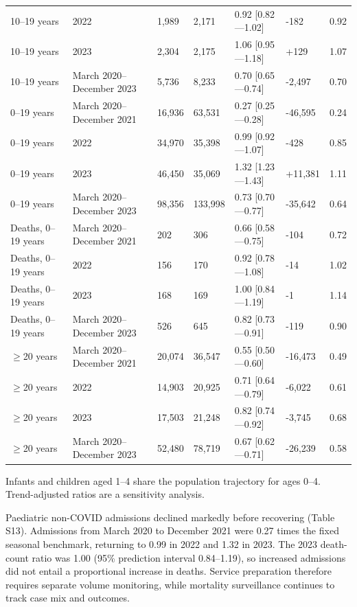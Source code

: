 \documentclass[11pt,a4paper]{article}
\begin{document}
\begin{longtable}{@{}L{18.79mm}L{36.02mm}L{20.36mm}L{20.36mm}L{20.36mm}L{20.36mm}L{20.36mm}@{}}
10–19 years & 2022 & 1,989 & 2,171 & 0.92 [0.82—1.02] & -182 & 0.92 \\
10–19 years & 2023 & 2,304 & 2,175 & 1.06 [0.95—1.18] & +129 & 1.07 \\
10–19 years & March 2020–December 2023 & 5,736 & 8,233 & 0.70 [0.65—0.74] & -2,497 & 0.70 \\
0–19 years & March 2020–December 2021 & 16,936 & 63,531 & 0.27 [0.25—0.28] & -46,595 & 0.24 \\
0–19 years & 2022 & 34,970 & 35,398 & 0.99 [0.92—1.07] & -428 & 0.85 \\
0–19 years & 2023 & 46,450 & 35,069 & 1.32 [1.23—1.43] & +11,381 & 1.11 \\
0–19 years & March 2020–December 2023 & 98,356 & 133,998 & 0.73 [0.70—0.77] & -35,642 & 0.64 \\
Deaths, 0–19 years & March 2020–December 2021 & 202 & 306 & 0.66 [0.58—0.75] & -104 & 0.72 \\
Deaths, 0–19 years & 2022 & 156 & 170 & 0.92 [0.78—1.08] & -14 & 1.02 \\
Deaths, 0–19 years & 2023 & 168 & 169 & 1.00 [0.84—1.19] & -1 & 1.14 \\
Deaths, 0–19 years & March 2020–December 2023 & 526 & 645 & 0.82 [0.73—0.91] & -119 & 0.90 \\
$\geq$20 years & March 2020–December 2021 & 20,074 & 36,547 & 0.55 [0.50—0.60] & -16,473 & 0.49 \\
$\geq$20 years & 2022 & 14,903 & 20,925 & 0.71 [0.64—0.79] & -6,022 & 0.61 \\
$\geq$20 years & 2023 & 17,503 & 21,248 & 0.82 [0.74—0.92] & -3,745 & 0.68 \\
$\geq$20 years & March 2020–December 2023 & 52,480 & 78,719 & 0.67 [0.62—0.71] & -26,239 & 0.58 \\
\end{longtable}\endgroup
{\small Infants and children aged 1–4 share the population trajectory for ages 0–4. Trend-adjusted ratios are a sensitivity analysis.\par}
Paediatric non-COVID admissions declined markedly before recovering (Table S13). Admissions from March 2020 to December 2021 were 0.27 times the fixed seasonal benchmark, returning to 0.99 in 2022 and 1.32 in 2023. The 2023 death-count ratio was 1.00 (95\% prediction interval 0.84–1.19), so increased admissions did not entail a proportional increase in deaths. Service preparation therefore requires separate volume monitoring, while mortality surveillance continues to track case mix and outcomes.
\end{document}
